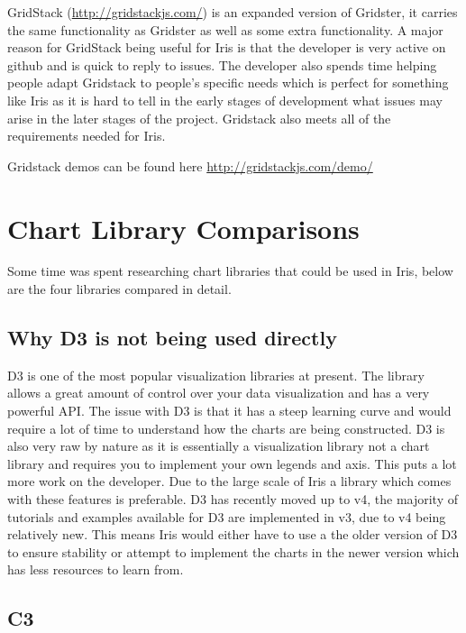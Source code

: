 \documentclass[12pt,a4paper,titlepage]{report}
\begin{document}
\begin{appendices}
GridStack (\url{http://gridstackjs.com/}) is an expanded version of Gridster, it carries the same functionality as Gridster as well as some extra functionality. A major reason for GridStack being useful for Iris is that the developer is very active on github and is quick to reply to issues. The developer also spends time helping people adapt Gridstack to people's specific needs which is perfect for something like Iris as it is hard to tell in the early stages of development what issues may arise in the later stages of the project. Gridstack also meets all of the requirements needed for Iris.

Gridstack demos can be found here \url{http://gridstackjs.com/demo/}



\chapter{Chart Library Comparisons}\label{sec:charts}

Some time was spent researching chart libraries that could be used in Iris, below are the four libraries compared in detail.

\section{Why D3 is not being used directly}

D3 is one of the most popular visualization libraries at present. The library allows a great amount of control over your data visualization and has a very powerful API. The issue with D3 is that it has a steep learning curve and would require a lot of time to understand how the charts are being constructed. D3 is also very raw by nature as it is essentially a visualization library not a chart library and requires you to implement your own legends and axis. This puts a lot more work on the developer. Due to the large scale of Iris a library which comes with these features is preferable. D3 has recently moved up to v4, the majority of tutorials and examples available for D3 are implemented in v3, due to v4 being relatively new. This means Iris would either have to use a the older version of D3 to ensure stability or attempt to implement the charts in the newer version which has less resources to learn from.

\section{C3}


\end{appendices}
\end{document}
